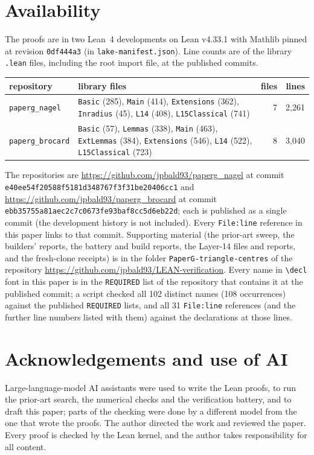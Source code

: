 \documentclass[11pt]{article}
\theoremstyle{definition}
\theoremstyle{remark}
\newcommand{\lean}[1]{\texttt{#1}}
\begin{document}
\section{Availability}\label{sec:avail}
The proofs are in two Lean~4 developments on Lean v4.33.1 with Mathlib pinned at revision
\texttt{0df444a3} (in \lean{lake-manifest.json}). Line counts are of the library \lean{.lean} files,
including the root import file, at the published commits.
\begin{center}\small
\begin{tabular}{lp{8.2cm}rr}
\toprule
repository & library files & files & lines\\
\midrule
\lean{paperg\_nagel} & \lean{Basic} (285), \lean{Main} (414), \lean{Extensions} (362), \lean{Inradius} (45), \lean{L14} (408), \lean{L15Classical} (741) & 7 & 2{,}261\\
\lean{paperg\_brocard} & \lean{Basic} (57), \lean{Lemmas} (338), \lean{Main} (463), \lean{ExtLemmas} (384), \lean{Extensions} (546), \lean{L14} (522), \lean{L15Classical} (723) & 8 & 3{,}040\\
\bottomrule
\end{tabular}
\end{center}
The repositories are \url{https://github.com/jpbald93/paperg_nagel} at commit
\texttt{e40ee54f20588f5181d348767f3f31be20406cc1} and
\url{https://github.com/jpbald93/paperg_brocard} at commit
\texttt{ebb35755a81aec2c7c0673fe93baf8cc5d6eb22d}; each is published as a single commit (the
development history is not included). Every \texttt{File:line} reference in this paper links to
that commit. Supporting material (the prior-art sweep,
the builders' reports, the battery and build reports, the Layer-14 files and reports, and the
fresh-clone receipts) is in the folder \lean{PaperG-triangle-centres} of the repository
\url{https://github.com/jpbald93/LEAN-verification}.
Every name in \lean{\textbackslash decl} font in this paper is in the \lean{REQUIRED} list of the
repository that contains it at the published commit; a script checked all 102 distinct names (108 occurrences) against the
published \lean{REQUIRED} lists, and all 31 \texttt{File:line} references (and the further line
numbers listed with them) against the declarations at those lines.

\section*{Acknowledgements and use of AI}
Large-language-model AI assistants were used to write the Lean proofs, to run the prior-art search,
the numerical checks and the verification battery, and to draft this paper; parts of the checking were
done by a different model from the one that wrote the proofs. The author directed the work and
reviewed the paper. Every proof is checked by the Lean kernel, and the author takes responsibility for
all content.
\end{document}
